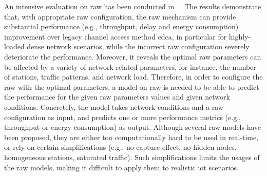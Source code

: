 

An intensive evaluation on \gls{raw} has been conducted in ~\cite{WoWMoM2016}. The results demonstrate that, with appropriate \gls{raw} configuration, the \gls{raw} mechanism can provide substantial performance (e.g., throughput, delay and energy consumption) improvement over legacy channel access method \gls{edca}, in particular for highly-loaded dense network scenarios, while the incorrect \gls{raw} configuration severely deteriorate the performance. Moreover, it reveals the optimal \gls{raw} parameters can be affected by a variety of network-related parameters, for instance, the number of stations, traffic patterns, and network load. Therefore, in order to configure the \gls{raw} with the optimal parameters, a model on \gls{raw} is needed to be able to predict the performance for the given \gls{raw} parameters values and given network conditions. Concretely, the model takes network conditions and a \gls{raw} configuration as input, and predicts one or more performance metrics (e.g., throughput or energy consumption) as output. Although several \gls{raw} models have been proposed, they are either too computationally hard to be used in real-time, or rely on certain simplifications (e.g., no capture effect, no hidden nodes, homogeneous stations, saturated traffic). Such simplifications limits the usages of the \gls{raw} models, making it difficult to apply them to realistic \gls{iot} scenarios.

